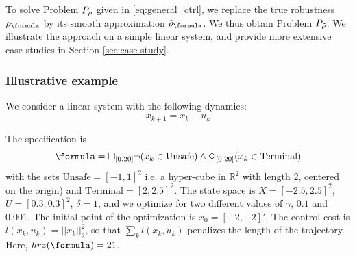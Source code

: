To solve Problem $P_\rho$ given in \eqref{eq:general_ctrl}, we replace the true robustness $\robf$ by its smooth approximation $\srobf$.
We thus obtain Problem $P_{\tilde{\rho}}$.
We illustrate the approach on a simple linear system,
and provide more extensive case studies in Section \ref{sec:case study}.

\subsubsection{Illustrative example}
\label{sec:illustrative example}
We consider a linear system with the following dynamics:
\begin{equation}
\label{eq:PointMass}
x_{k+1} = x_k + u_k
\end{equation}

The specification is 
\[\formula = \always_{[0,20]} \neg (x_k \in \text{Unsafe}) \land \eventually_{[0,20]} (x_k \in \text{Terminal})\]
with the sets $\text{Unsafe}=[-1,1]^2$ i.e. a hyper-cube in $\mathbb{R}^2$ with length 2, centered on the origin) and $\text{Terminal}=[2,2.5]^2$. 
The state space is $X=[-2.5,2.5]^2$, $U=[0.3,0.3]^2$, $\delta=1$, and we optimize for two different values of $\gamma$, $0.1$ and $0.001$. 
The initial point of the optimization is $x_0=[-2,-2]'$. 
The control cost is $l(x_k,u_k) = ||x_k||_{2}^2$, so that $\sum_kl(x_k,u_k)$ penalizes the length of the trajectory. Here, $hrz(\formula) = 21$.


